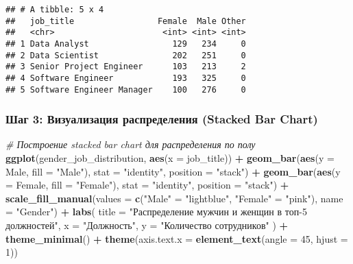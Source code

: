 \documentclass[
]{article}
\newenvironment{Shaded}{\begin{snugshade}}{\end{snugshade}}
\newcommand{\AttributeTok}[1]{\textcolor[rgb]{0.13,0.29,0.53}{#1}}
\newcommand{\CommentTok}[1]{\textcolor[rgb]{0.56,0.35,0.01}{\textit{#1}}}
\newcommand{\DecValTok}[1]{\textcolor[rgb]{0.00,0.00,0.81}{#1}}
\newcommand{\FunctionTok}[1]{\textcolor[rgb]{0.13,0.29,0.53}{\textbf{#1}}}
\newcommand{\NormalTok}[1]{#1}
\newcommand{\OtherTok}[1]{\textcolor[rgb]{0.56,0.35,0.01}{#1}}
\newcommand{\SpecialCharTok}[1]{\textcolor[rgb]{0.81,0.36,0.00}{\textbf{#1}}}
\newcommand{\StringTok}[1]{\textcolor[rgb]{0.31,0.60,0.02}{#1}}
\begin{document}
\begin{verbatim}
## # A tibble: 5 x 4
##   job_title                 Female  Male Other
##   <chr>                      <int> <int> <int>
## 1 Data Analyst                 129   234     0
## 2 Data Scientist               202   251     0
## 3 Senior Project Engineer      103   213     2
## 4 Software Engineer            193   325     0
## 5 Software Engineer Manager    100   276     0
\end{verbatim}

\subsubsection{Шаг 3: Визуализация распределения (Stacked Bar
Chart)}\label{ux448ux430ux433-3-ux432ux438ux437ux443ux430ux43bux438ux437ux430ux446ux438ux44f-ux440ux430ux441ux43fux440ux435ux434ux435ux43bux435ux43dux438ux44f-stacked-bar-chart}

\begin{Shaded}
\begin{Highlighting}[]
\CommentTok{\# Построение stacked bar chart для распределения по полу}
\FunctionTok{ggplot}\NormalTok{(gender\_job\_distribution, }\FunctionTok{aes}\NormalTok{(}\AttributeTok{x =}\NormalTok{ job\_title)) }\SpecialCharTok{+}
  \FunctionTok{geom\_bar}\NormalTok{(}\FunctionTok{aes}\NormalTok{(}\AttributeTok{y =}\NormalTok{ Male, }\AttributeTok{fill =} \StringTok{"Male"}\NormalTok{), }\AttributeTok{stat =} \StringTok{"identity"}\NormalTok{, }\AttributeTok{position =} \StringTok{"stack"}\NormalTok{) }\SpecialCharTok{+}
  \FunctionTok{geom\_bar}\NormalTok{(}\FunctionTok{aes}\NormalTok{(}\AttributeTok{y =}\NormalTok{ Female, }\AttributeTok{fill =} \StringTok{"Female"}\NormalTok{), }\AttributeTok{stat =} \StringTok{"identity"}\NormalTok{, }\AttributeTok{position =} \StringTok{"stack"}\NormalTok{) }\SpecialCharTok{+}
  \FunctionTok{scale\_fill\_manual}\NormalTok{(}\AttributeTok{values =} \FunctionTok{c}\NormalTok{(}\StringTok{"Male"} \OtherTok{=} \StringTok{"lightblue"}\NormalTok{, }\StringTok{"Female"} \OtherTok{=} \StringTok{"pink"}\NormalTok{), }\AttributeTok{name =} \StringTok{"Gender"}\NormalTok{) }\SpecialCharTok{+}
  \FunctionTok{labs}\NormalTok{(}
    \AttributeTok{title =} \StringTok{"Распределение мужчин и женщин в топ{-}5 должностей"}\NormalTok{,}
    \AttributeTok{x =} \StringTok{"Должность"}\NormalTok{,}
    \AttributeTok{y =} \StringTok{"Количество сотрудников"}
\NormalTok{  ) }\SpecialCharTok{+}
  \FunctionTok{theme\_minimal}\NormalTok{() }\SpecialCharTok{+}
  \FunctionTok{theme}\NormalTok{(}\AttributeTok{axis.text.x =} \FunctionTok{element\_text}\NormalTok{(}\AttributeTok{angle =} \DecValTok{45}\NormalTok{, }\AttributeTok{hjust =} \DecValTok{1}\NormalTok{))}
\end{Highlighting}
\end{Shaded}
\end{document}
